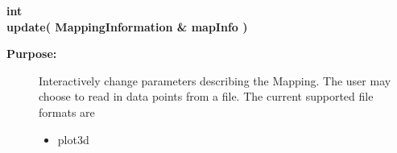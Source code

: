 \begin{flushleft} \textbf{%
int  \\ 
\settowidth{\DataPointMappingIncludeArgIndent}{update(}%
update( MappingInformation \& mapInfo ) 
}\end{flushleft}
\begin{description}
\item[{\bf Purpose:}]  
   Interactively change parameters describing the Mapping.
   The user may choose to read in data points from a file. The current supported
  file formats are
   \begin{itemize}
     \item plot3d 
   \end{itemize}
         
\end{description}
